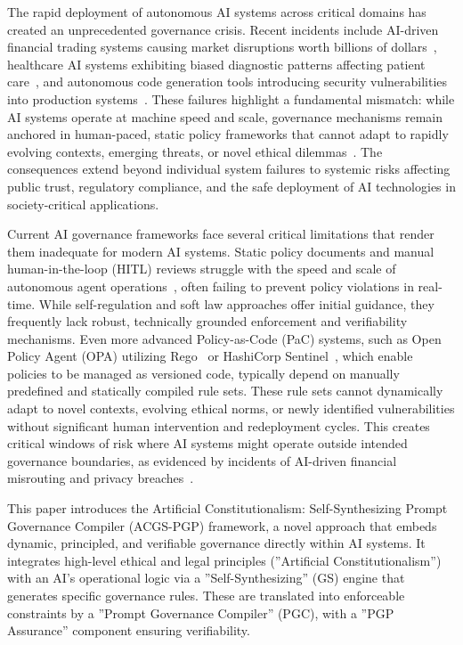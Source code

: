 \documentclass[sigconf,review,anonymous=false]{acmart} %
\begin{document}
The rapid deployment of autonomous AI systems across critical domains has created an unprecedented governance crisis. Recent incidents include AI-driven financial trading systems causing market disruptions worth billions of dollars~\cite{Allen2020}, healthcare AI systems exhibiting biased diagnostic patterns affecting patient care~\cite{BuolamwiniGebru18}, and autonomous code generation tools introducing security vulnerabilities into production systems~\cite{exampleCase24}. These failures highlight a fundamental mismatch: while AI systems operate at machine speed and scale, governance mechanisms remain anchored in human-paced, static policy frameworks that cannot adapt to rapidly evolving contexts, emerging threats, or novel ethical dilemmas~\cite{Bodenham2021}. The consequences extend beyond individual system failures to systemic risks affecting public trust, regulatory compliance, and the safe deployment of AI technologies in society-critical applications.

Current AI governance frameworks face several critical limitations that render them inadequate for modern AI systems. Static policy documents and manual human-in-the-loop (HITL) reviews struggle with the speed and scale of autonomous agent operations~\cite{Shneiderman2022}, often failing to prevent policy violations in real-time. While self-regulation and soft law approaches offer initial guidance, they frequently lack robust, technically grounded enforcement and verifiability mechanisms. Even more advanced Policy-as-Code (PaC) systems, such as Open Policy Agent (OPA) utilizing Rego~\cite{OPAJourney} or HashiCorp Sentinel~\cite{HashiCorpSentinel}, which enable policies to be managed as versioned code, typically depend on manually predefined and statically compiled rule sets. These rule sets cannot dynamically adapt to novel contexts, evolving ethical norms, or newly identified vulnerabilities without significant human intervention and redeployment cycles. This creates critical windows of risk where AI systems might operate outside intended governance boundaries, as evidenced by incidents of AI-driven financial misrouting and privacy breaches~\cite{Allen2020, exampleGovernanceFailure23}.

This paper introduces the Artificial Constitutionalism: Self-Synthesizing Prompt Governance Compiler (ACGS-PGP) framework, a novel approach that embeds dynamic, principled, and verifiable governance directly within AI systems. It integrates high-level ethical and legal principles (''Artificial Constitutionalism'') with an AI's operational logic via a ''Self-Synthesizing'' (GS) engine that generates specific governance rules. These are translated into enforceable constraints by a ''Prompt Governance Compiler'' (PGC), with a ''PGP Assurance'' component ensuring verifiability.
\end{document}

